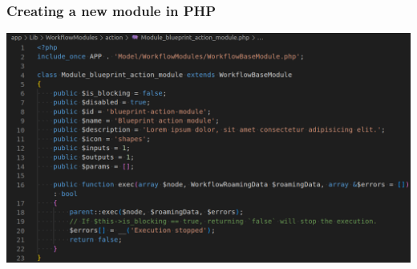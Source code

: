 \begin{frame}
    \frametitle{Creating a new module in PHP}
    \begin{center}
        \includegraphics[width=1.0\linewidth]{pictures/custom-1.png}
    \end{center}
\end{frame}

